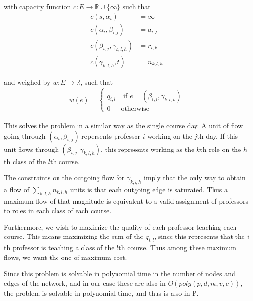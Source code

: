 with capacity function $c:E \to \mathbb{R} \cup \{\infty\}$ such that
\begin{align*}
  c(s, \alpha_i) &= \infty\\
  c(\alpha_i, \beta_{i, j}) &= a_{i, j}\\
  c(\beta_{i, j}, \gamma_{k, l, h}) &= r_{i, k}\\
  c(\gamma_{k, l, h}, t) &= n_{k, l, h}
\end{align*}

and weighed by $w:E \to \mathbb{R}$, such that
\begin{align*}
  w(e) = \begin{cases}
    q_{i, l} & \text{ if } e = (\beta_{i, j}, \gamma_{k, l, h})\\
    0 & \text{otherwise}
  \end{cases}
\end{align*}

This solves the problem in a similar way as the single course day. A unit of flow going through $(\alpha_i, \beta_{i, j})$ repersents professor $i$ working on the $j$th day. If this unit flows through $(\beta_{i, j}, \gamma_{k, l, h})$, this represents working as the $k$th role on the $h$th class of the $l$th course.

The constraints on the outgoing flow for $\gamma_{k, l, h}$ imply that the only way to obtain a flow of $\sum_{k, l, h} n_{k, l, h}$ units is that each outgoing edge is saturated. Thus a maximum flow of that magnitude is equivalent to a valid assignment of professors to roles in each class of each course.

Furthermore, we wish to maximize the quality of each professor teaching each course. This means maximizing the sum of the $q_{i, l}$, since this represents that the $i$th professor is teaching a class of the $l$th course. Thus among these maximum flows, we want the one of maximum cost.

Since this problem is solvable in polynomial time in the number of nodes and edges of the network, and in our case these are also in $O(poly(p, d, m, v, c))$, the problem is solvable in polynomial time, and thus is also in \textsc{P}.

